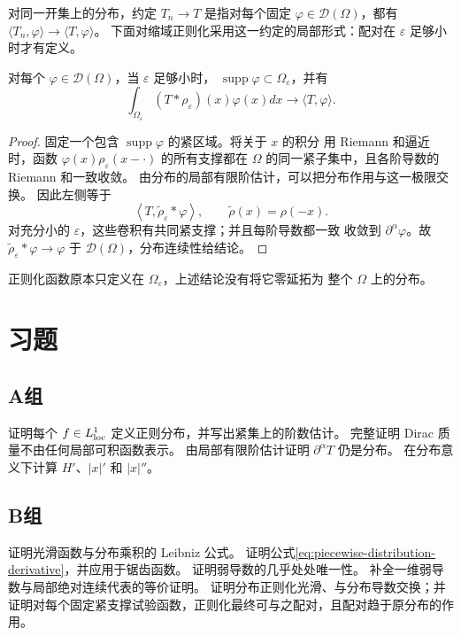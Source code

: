 对同一开集上的分布，约定 \(T_n\to T\) 是指对每个固定
\(\varphi\in\mathcal D(\Omega)\)，都有
\(\langle T_n,\varphi\rangle\to\langle T,\varphi\rangle\)。
下面对缩域正则化采用这一约定的局部形式：配对在 \(\varepsilon\) 足够小时才有定义。

\begin{theorem}\label{thm:distribution-mollification}
对每个 \(\varphi\in\mathcal D(\Omega)\)，当 \(\varepsilon\) 足够小时，
\(\operatorname{supp}\varphi\subset\Omega_\varepsilon\)，并有
\[
 \int_{\Omega_\varepsilon}(T*\rho_\varepsilon)(x)\varphi(x)dx
 \longrightarrow\langle T,\varphi\rangle.
\]
\end{theorem}
\begin{proof}
固定一个包含 \(\operatorname{supp}\varphi\) 的紧区域。将关于 \(x\) 的积分
用 Riemann 和逼近时，函数
\(\varphi(x)\rho_\varepsilon(x-\cdot)\) 的所有支撑都在
\(\Omega\) 的同一紧子集中，且各阶导数的 Riemann 和一致收敛。
由分布的局部有限阶估计，可以把分布作用与这一极限交换。
因此左侧等于
\[
 \left\langle T,\widetilde\rho_\varepsilon*\varphi\right\rangle,
 \qquad \widetilde\rho(x)=\rho(-x).
\]
对充分小的 \(\varepsilon\)，这些卷积有共同紧支撑；并且每阶导数都一致
收敛到 \(\partial^\alpha\varphi\)。故
\(\widetilde\rho_\varepsilon*\varphi\to\varphi\) 于
\(\mathcal D(\Omega)\)，分布连续性给结论。
\end{proof}

正则化函数原本只定义在 \(\Omega_\varepsilon\)，上述结论没有将它零延拓为
整个 \(\Omega\) 上的分布。

\section*{习题}
\subsection*{A组}
\begin{enumerate}[label=\textbf{\thechapter.\arabic*.}]
证明每个 \(f\in L^1_{\rm loc}\) 定义正则分布，并写出紧集上的阶数估计。
完整证明 Dirac 质量不由任何局部可积函数表示。
由局部有限阶估计证明 \(\partial^\alpha T\) 仍是分布。
在分布意义下计算 \(H'\)、\(|x|'\) 和 \(|x|''\)。
\end{enumerate}
\subsection*{B组}
\begin{enumerate}[label=\textbf{\thechapter.\arabic*.},resume]
证明光滑函数与分布乘积的 Leibniz 公式。
证明公式\eqref{eq:piecewise-distribution-derivative}，并应用于锯齿函数。
证明弱导数的几乎处处唯一性。
补全一维弱导数与局部绝对连续代表的等价证明。
证明分布正则化光滑、与分布导数交换；并证明对每个固定紧支撑试验函数，正则化最终可与之配对，且配对趋于原分布的作用。
\end{enumerate}
